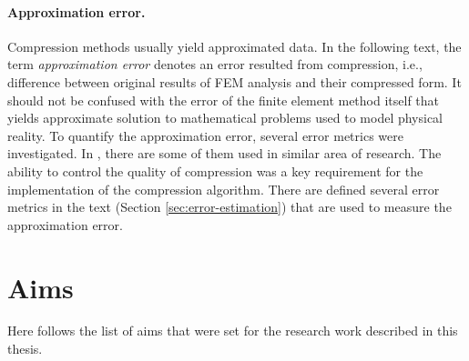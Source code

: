 \paragraph{Approximation error.} Compression methods usually yield approximated data. In the following text, the term \textit{approximation error} denotes an error resulted from compression, i.e., difference between original results of FEM analysis and their compressed form. It should not be confused with the error of the finite element method itself that yields approximate solution to mathematical problems used to model physical reality. To quantify the approximation error, several error metrics were investigated. In \cite{SairaBanu2015}, there are some of them used in similar area of research. The ability to control the quality of compression was a key requirement for the implementation of the compression algorithm. There are defined several error metrics in the text (Section \ref{sec:error-estimation}) that are used to measure the approximation error.




\section{Aims} %
\label{sec:aims}

Here follows the list of aims that were set for the research work described in this thesis.

